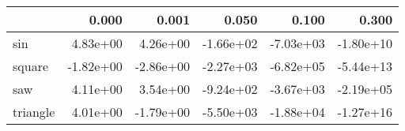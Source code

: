 \begin{tabular}{lrrrrr}
\toprule
{} &     0.000 &     0.001 &     0.050 &     0.100 &     0.300 \\
\midrule
sin      &  4.83e+00 &  4.26e+00 & -1.66e+02 & -7.03e+03 & -1.80e+10 \\
square   & -1.82e+00 & -2.86e+00 & -2.27e+03 & -6.82e+05 & -5.44e+13 \\
saw      &  4.11e+00 &  3.54e+00 & -9.24e+02 & -3.67e+03 & -2.19e+05 \\
triangle &  4.01e+00 & -1.79e+00 & -5.50e+03 & -1.88e+04 & -1.27e+16 \\
\bottomrule
\end{tabular}
